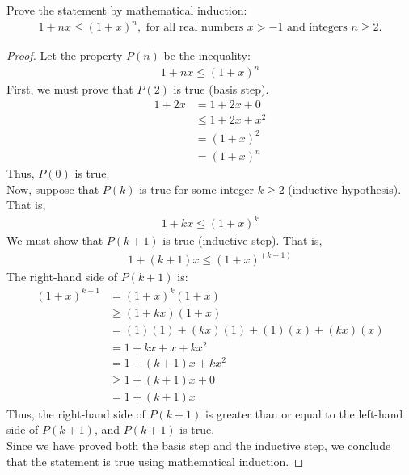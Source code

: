 \documentclass[name=Ojas\ Chaturvedi, emailid=oj.chaturvedi.2024, course=Capstone:\ Discrete\ Math, num=9, deadline={November\ 17,\ 2023}]{homework}
\begin{document}
    Prove the statement by mathematical induction:
    \begin{align*}
        1 + nx \leq {(1 + x)}^n, \text{ for all real numbers } x > -1 \text{ and integers } n \geq 2.
    \end{align*}
\begin{proof}
    Let the property $P(n)$ be the inequality:
    \begin{align*}
        1 + nx \leq {(1 + x)}^n
    \end{align*}
    First, we must prove that $P(2)$ is true (basis step).
    \begin{align*}
        1 + 2x &= 1 + 2x + 0\\
        &\leq 1 + 2x + x^2 \\
        &= {(1 + x)}^2 \\
        &= {(1 + x)}^n
    \end{align*}
    Thus, $P(0)$ is true. \\
    Now, suppose that $P(k)$ is true for some integer $k \geq 2$ (inductive hypothesis). That is,
    \begin{align*}
        1 + kx \leq {(1 + x)}^k
    \end{align*}
    We must show that $P(k+1)$ is true (inductive step). That is,
    \begin{align*}
        1 + {(k+1)}x \leq {(1 + x)}^{(k+1)}
    \end{align*}
    The right-hand side of $P(k+1)$ is:
    \begin{align*}
        (1+x)^{k+1}&=(1+x)^{k}(1+x) \\
        &\geq(1+k x)(1+x) \\
        &=(1)(1)+(k x)(1)+(1)(x)+(k x)(x) \\
        &=1+k x+x+k x^{2} \\
        &=1+(k+1) x+k x^{2} \\
        &\geq 1+(k+1) x+0 \\
        &=1+(k+1) x
    \end{align*}
    Thus, the right-hand side of $P(k+1)$ is greater than or equal to the left-hand side of $P(k+1)$, and $P(k+1)$ is true. \\
    Since we have proved both the basis step and the inductive step, we conclude that the statement is true using mathematical induction.
\end{proof}
\end{document}
